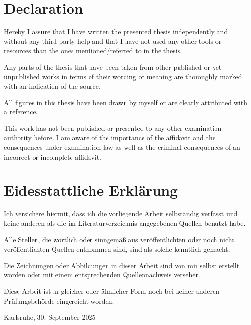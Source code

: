
\ifdefined\ThesisLanguageIsEnglish
	\chapter*{Declaration}
		\thispagestyle{empty}
		Hereby I assure that I have written the presented thesis independently and without any third party help and that I have not used any other tools or resources than the ones mentioned/referred to in the thesis.
	\medskip

	\noindent
		Any parts of the thesis that have been taken from other published or yet unpublished works in terms of their wording or meaning are thoroughly marked with an indication of the source. 
	\medskip

	\noindent
		All figures in this thesis have been drawn by myself or are clearly attributed with a reference. 
	\medskip

	\noindent
		This work has not been published or presented to any other examination authority before.
		I am aware of the importance of the affidavit and the consequences under examination
		law as well as the criminal consequences of an incorrect or incomplete affidavit.
	\medskip


\else
	\chapter*{Eidesstattliche Erklärung}
		\thispagestyle{empty}
			Ich versichere hiermit, dass ich die vorliegende Arbeit selbständig verfasst und keine anderen als die im Literaturverzeichnis angegebenen Quellen benutzt habe.
		\medskip

		\noindent
			Alle Stellen, die wörtlich oder sinngemäß aus veröffentlichten oder noch nicht veröffentlichten Quellen entnommen sind, sind als solche kenntlich gemacht.
		\medskip

		\noindent
			Die Zeichnungen oder Abbildungen in dieser Arbeit sind von mir selbst erstellt worden oder mit einem entsprechenden Quellennachweis versehen.
		\medskip

		\noindent
			Diese Arbeit ist in gleicher oder ähnlicher Form noch bei keiner anderen Prüfungsbehörde eingereicht worden. 
		\bigskip
\fi

Karlsruhe, 30. September 2025

\smallskip

